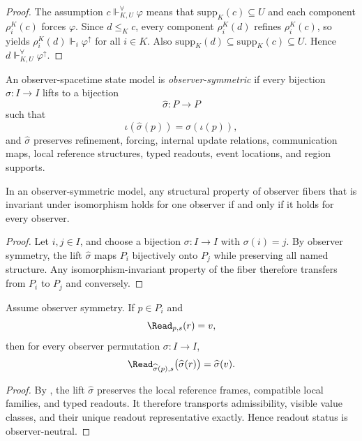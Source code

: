 \begin{proof}
The assumption $c\Vdash^{\forall}_{K,U}\varphi$ means that $\mathrm{supp}_K(c)\subseteq U$ and each component $\rho_i^K(c)$ forces $\varphi$. Since $d\le_K c$, every component $\rho_i^K(d)$ refines $\rho_i^K(c)$, so  yields $\rho_i^K(d)\Vdash_i\varphi^\uparrow$ for all $i\in K$. Also $\mathrm{supp}_K(d)\subseteq \mathrm{supp}_K(c)\subseteq U$. Hence $d\Vdash^{\forall}_{K,U}\varphi^\uparrow$.
\end{proof}

\begin{definition}\label{def:observer-symmetry}
An observer-spacetime state model is \emph{observer-symmetric} if every bijection $\sigma:I\to I$ lifts to a bijection
\[
\widehat{\sigma}:P\to P
\]
such that
\[
\iota(\widehat{\sigma}(p))=\sigma(\iota(p)),
\]
and $\widehat{\sigma}$ preserves refinement, forcing, internal update relations, communication maps, local reference structures, typed readouts, event locations, and region supports.
\end{definition}

\begin{proposition}\label{prop:no-privileged-observer}
In an observer-symmetric model, any structural property of observer fibers that is invariant under isomorphism holds for one observer if and only if it holds for every observer.
\end{proposition}

\begin{proof}
Let $i,j\in I$, and choose a bijection $\sigma:I\to I$ with $\sigma(i)=j$. By observer symmetry, the lift $\widehat{\sigma}$ maps $P_i$ bijectively onto $P_j$ while preserving all named structure. Any isomorphism-invariant property of the fiber therefore transfers from $P_i$ to $P_j$ and conversely.
\end{proof}

\begin{corollary}\label{cor:observer-neutral-readout}
Assume observer symmetry. If $p\in P_i$ and
\[
\Read_{p,s}(r)=v,
\]
then for every observer permutation $\sigma:I\to I$,
\[
\Read_{\widehat{\sigma}(p),s}\bigl(\widehat{\sigma}(r)\bigr)=\widehat{\sigma}(v).
\]
\end{corollary}

\begin{proof}
By , the lift $\widehat{\sigma}$ preserves the local reference frames, compatible local families, and typed readouts. It therefore transports admissibility, visible value classes, and their unique readout representative exactly. Hence readout status is observer-neutral.
\end{proof}

